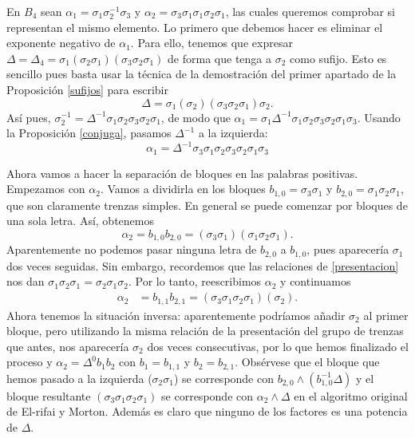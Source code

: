 \documentclass[bibtex, anon]{TEMat-article}
\begin{document}
\begin{ejemplo}
	En $B_4$ sean $\alpha_1=\sigma_1\sigma_2^{-1}\sigma_3$ y $\alpha_2=\sigma_3\sigma_1\sigma_1\sigma_2\sigma_1$, las cuales queremos comprobar si representan el mismo elemento. Lo primero que debemos hacer es eliminar el exponente negativo de $\alpha_1$. Para ello, tenemos que expresar $\Delta=\Delta_4=\sigma_1(\sigma_2\sigma_1)(\sigma_3\sigma_2\sigma_1)$ de forma que tenga a $\sigma_2$ como sufijo. Esto es sencillo pues basta usar la técnica de la demostración del primer apartado de la Proposición \ref{sufijos} para escribir
	\[
	\Delta=\sigma_1(\sigma_2)(\sigma_3\sigma_2\sigma_1)\sigma_2.
	\]
	Así pues, $\sigma_2^{-1}=\Delta^{-1}\sigma_1\sigma_2\sigma_3\sigma_2\sigma_1$, de modo que $\alpha_1=\sigma_1\Delta^{-1}\sigma_1\sigma_2\sigma_3\sigma_2\sigma_1\sigma_3$. Usando la Proposición \ref{conjuga}, pasamos $\Delta^{-1}$ a la izquierda:
	\[
	\alpha_1=\Delta^{-1}\sigma_3\sigma_1\sigma_2\sigma_3\sigma_2\sigma_1\sigma_3
	\]
	
	Ahora vamos a hacer la separación de bloques en las palabras positivas. Empezamos con $\alpha_2$. Vamos a dividirla en los bloques $b_{1,0}=\sigma_3\sigma_1$ y $b_{2,0}=\sigma_1\sigma_2\sigma_1$, que son claramente trenzas simples. En general se puede comenzar por bloques de una sola letra. Así, obtenemos
	\[
	\alpha_2=b_{1,0}b_{2,0}=(\sigma_3\sigma_1)(\sigma_1\sigma_2\sigma_1).
	\]
	Aparentemente no podemos pasar ninguna letra de $b_{2,0}$ a $b_{1,0}$, pues aparecería $\sigma_1$ dos veces seguidas. Sin embargo, recordemos que las relaciones de \ref{presentacion} nos dan $\sigma_1\sigma_2\sigma_1=\sigma_2\sigma_1\sigma_2$. Por lo tanto, reescribimos $\alpha_2$ y continuamos
	\begin{align*}
	\alpha_2&=b_{1,1}b_{2,1}=(\sigma_3\sigma_1\sigma_2\sigma_1)(\sigma_2).
	\end{align*}
	Ahora tenemos la situación inversa: aparentemente podríamos añadir $\sigma_2$ al primer bloque, pero utilizando la misma relación de la presentación del grupo de trenzas que antes, nos aparecería $\sigma_2$ dos veces consecutivas, por lo que hemos finalizado el proceso y $\alpha_2=\Delta^0b_1b_2$ con $b_1=b_{1,1}$ y $b_2=b_{2,1}$. Obsérvese que el bloque que hemos pasado a la izquierda ($\sigma_2\sigma_1$) se corresponde con $b_{2,0}\land (b_{1,0}^{-1}\Delta)$ y el bloque resultante $(\sigma_3\sigma_1\sigma_2\sigma_1)$ se corresponde con $\alpha_2\land\Delta$ en el algoritmo original de El-rifai y Morton. Además es claro que ninguno de los factores es una potencia de $\Delta$.
	\end{ejemplo}

\nocite{*}
\printbibliography[heading=bibintoc]
\end{document}
